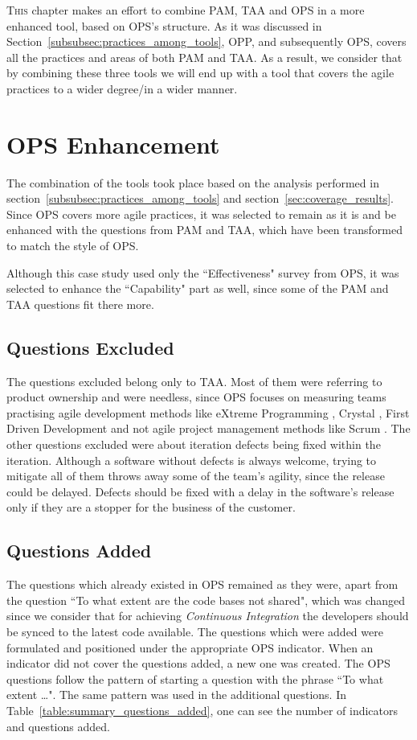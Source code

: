 \lettrine[lines=2, loversize=-0.1, lraise=0.1]{T}{his} chapter makes an effort to combine \ac{PAM}, \ac{TAA} and \ac{OPS} in a more enhanced tool, based on \ac{OPS}'s structure. As it was discussed in Section~\ref{subsubsec:practices_among_tools}, \ac{OPP}, and subsequently \ac{OPS}, covers all the practices and areas of both \ac{PAM} and \ac{TAA}. As a result, we consider that by combining these three tools we will end up with a tool that covers the agile practices to a wider degree/in a wider manner.

\section{\ac{OPS} Enhancement}
The combination of the tools took place based on the analysis performed in section~\ref{subsubsec:practices_among_tools} and section~\ref{sec:coverage_results}. Since \ac{OPS} covers more agile practices, it was selected to remain as it is and be enhanced with the questions from \ac{PAM} and \ac{TAA}, which have been transformed to match the style of \ac{OPS}.

Although this case study used only the ``Effectiveness" survey from \ac{OPS}, it was selected to enhance the ``Capability" part as well, since some of the \ac{PAM} and \ac{TAA} questions fit there more.

\subsection{Questions Excluded}
The questions excluded belong only to \ac{TAA}. Most of them were referring to product ownership and were needless, since \ac{OPS} focuses on measuring teams practising agile development methods like eXtreme Programming \cite{Beck:2004:EPE:1076267}, Crystal \cite{Cockburn:2004:CCH:1406822}, First Driven Development \cite{Palmer:2001:PGF:600044} and not agile project management methods like Scrum \cite{scrum}. The other questions excluded were about iteration defects being fixed within the iteration. Although a software without defects is always welcome, trying to mitigate all of them throws away some of the team's agility, since the release could be delayed. Defects should be fixed with a delay in the software's release only if they are a stopper for the business of the customer.

\subsection{Questions Added}
The questions which already existed in \ac{OPS} remained as they were, apart from the question ``To what extent are the code bases not shared", which was changed since we consider that for achieving \textit{Continuous Integration} the developers should be synced to the latest code available. The questions which were added were formulated and positioned under the appropriate \ac{OPS} indicator. When an indicator did not cover the questions added, a new one was created. The \ac{OPS} questions follow the pattern of starting a question with the phrase ``To what extent \dots ". The same pattern was used in the additional questions. In Table~\ref{table:summary_questions_added}, one can see the number of indicators and questions added. 

